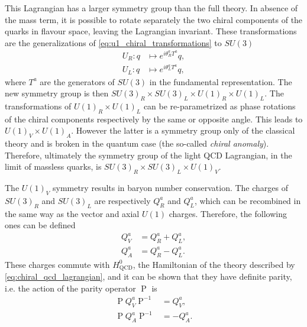 This Lagrangian has a larger symmetry group than the full theory. In absence of the mass term, it is possible to rotate separately the two chiral components of the quarks in flavour space, leaving the Lagrangian invariant. These transformations are the generalizations of \eqref{eq:u1_chiral_transformations} to $SU(3)$ 
\begin{subequations}
  \begin{align}
    U_R \colon q & \mapsto e^{i \theta_R^a T^a} q , \\
    U_L \colon q & \mapsto e^{i \theta_L^a T^a} q ,
  \end{align}
\end{subequations}
where $T^a$ are the generators of $SU(3)$ in the fundamental representation. The new symmetry group is then $SU(3)_R \times SU(3)_L \times U(1)_R \times U(1)_L$. The transformations of $U(1)_R \times U(1)_L$ can be re-parametrized as phase rotations of the chiral components respectively by the same or opposite angle. This leads to $U(1)_V \times U(1)_A$. However the latter is a symmetry group only of the classical theory and is broken in the quantum case (the so-called \emph{chiral anomaly}). Therefore, ultimately the symmetry group of the light QCD Lagrangian, in the limit of massless quarks, is $SU(3)_R \times SU(3)_L \times U(1)_V$. 

The $U(1)_V$ symmetry results in baryon number conservation. The charges of $SU(3)_R$ and $SU(3)_L$ are respectively $Q^a_R$ and $Q^a_L$, which can be recombined in the same way as the vector and axial $U(1)$ charges. Therefore, the following ones can be defined
\begin{subequations}
  \begin{align}
    Q^a_V &= Q^a_R + Q^a_L , \\
    Q^a_A &= Q^a_R - Q^a_L .
  \end{align}
\end{subequations}
These charges commute with $H^0_\text{QCD}$, the Hamiltonian of the theory described by \eqref{eq:chiral_qcd_lagrangian}, and it can be shown that they have definite parity, i.e. the action of the parity operator $\operatorname{P}$ is
\begin{subequations}
  \begin{align}
    \operatorname{P} Q^a_V \operatorname{P}^{-1} &= Q^a_V , \\
    \operatorname{P} Q^a_A \operatorname{P}^{-1} &= - Q^a_A .
  \end{align}
\end{subequations}

